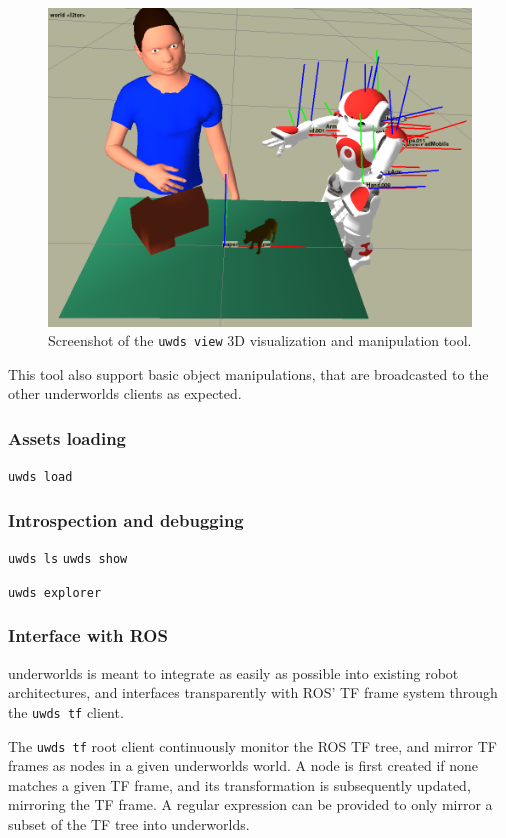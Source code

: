 \documentclass[letterpaper, 10 pt, conference]{ieeeconf}  %
\newcommand{\uwds}{{\sc underworlds}\xspace}
\begin{document}
\begin{figure}
    \centering
    \includegraphics[width=0.9\linewidth]{uwds-screenshot}
    \caption{Screenshot of the {\tt uwds view} 3D visualization and manipulation
    tool.}
    \label{fig|uwds-view}
\end{figure}

This tool also support basic object manipulations, that are broadcasted to the
other \uwds clients as expected.

\subsubsection{Assets loading}

{\tt uwds load}

\subsubsection{Introspection and debugging}

{\tt uwds ls}
{\tt uwds show}

{\tt uwds explorer}


\subsubsection{Interface with ROS}

\uwds is meant to integrate as easily as possible into existing robot
architectures, and interfaces transparently with ROS' TF frame system through
the {\tt uwds tf} client.

The {\tt uwds tf} root client continuously monitor the ROS TF tree, and mirror
TF frames as nodes in a given \uwds world. A node is first created if none
matches a given TF frame, and its transformation is subsequently updated,
mirroring the TF frame. A regular expression can be provided to only mirror a
subset of the TF tree into \uwds.
\end{document}
